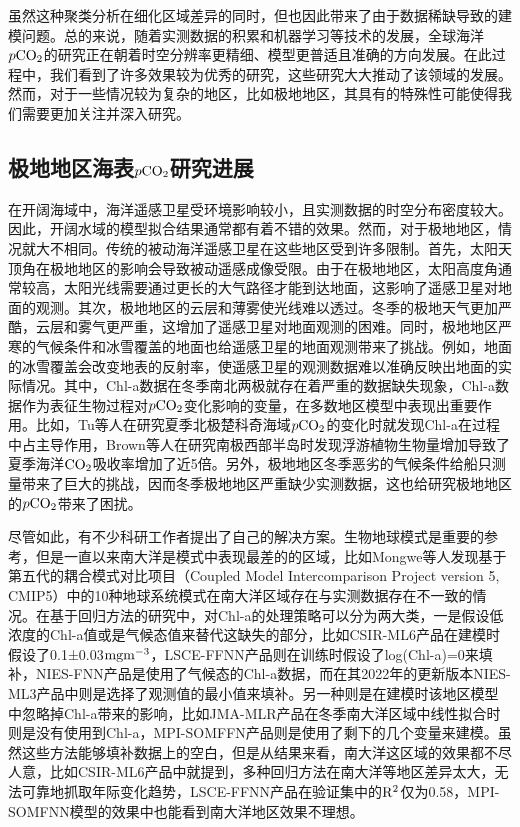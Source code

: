 虽然这种聚类分析在细化区域差异的同时，但也因此带来了由于数据稀缺导致的建模问题。总的来说，随着实测数据的积累和机器学习等技术的发展，全球海洋$p\rm CO_2$的研究正在朝着时空分辨率更精细、模型更普适且准确的方向发展。在此过程中，我们看到了许多效果较为优秀的研究，这些研究大大推动了该领域的发展。然而，对于一些情况较为复杂的地区，比如极地地区，其具有的特殊性可能使得我们需要更加关注并深入研究。

\subsection{极地地区海表\texorpdfstring{$p\rm CO_2$}{}研究进展}
在开阔海域中，海洋遥感卫星受环境影响较小，且实测数据的时空分布密度较大。因此，开阔水域的模型拟合结果通常都有着不错的效果。然而，对于极地地区，情况就大不相同。传统的被动海洋遥感卫星在这些地区受到许多限制。首先，太阳天顶角在极地地区的影响会导致被动遥感成像受限。由于在极地地区，太阳高度角通常较高，太阳光线需要通过更长的大气路径才能到达地面，这影响了遥感卫星对地面的观测。其次，极地地区的云层和薄雾使光线难以透过。冬季的极地天气更加严酷，云层和雾气更严重，这增加了遥感卫星对地面观测的困难。同时，极地地区严寒的气候条件和冰雪覆盖的地面也给遥感卫星的地面观测带来了挑战。例如，地面的冰雪覆盖会改变地表的反射率，使遥感卫星的观测数据难以准确反映出地面的实际情况。其中，Chl-a数据在冬季南北两极就存在着严重的数据缺失现象，Chl-a数据作为表征生物过程对$p\rm CO_2$变化影响的变量，在多数地区模型中表现出重要作用。比如，Tu等人\cite{tu2021increase}在研究夏季北极楚科奇海域$p\rm CO_2$的变化时就发现Chl-a在过程中占主导作用，Brown等人\cite{brown2019enhanced}在研究南极西部半岛时发现浮游植物生物量增加导致了夏季海洋$\rm CO_2$吸收率增加了近5倍。另外，极地地区冬季恶劣的气候条件给船只测量带来了巨大的挑战，因而冬季极地地区严重缺少实测数据，这也给研究极地地区的$p\rm CO_2$带来了困扰。

尽管如此，有不少科研工作者提出了自己的解决方案。生物地球模式\cite{mongwe2016seasonal,mongwe2018seasonal,kessler2016southern}是重要的参考，但是一直以来南大洋是模式中表现最差的的区域，比如Mongwe等人\cite{mongwe2018seasonal}发现基于第五代的耦合模式对比项目（Coupled Model Intercomparison Project version 5, CMIP5）中的10种地球系统模式在南大洋区域存在与实测数据存在不一致的情况。在基于回归方法的研究中，对Chl-a的处理策略可以分为两大类，一是假设低浓度的Chl-a值或是气候态值来替代这缺失的部分，比如CSIR-ML6产品\cite{CSIR_ML6}在建模时假设了0.1±0.03$\rm mg m^{-3}$，LSCE-FFNN产品\cite{LSCE_FFNN}则在训练时假设了log(Chl-a)=0来填补，NIES-FNN产品\cite{zeng2014global}是使用了气候态的Chl-a数据，而在其2022年的更新版本NIES-ML3产品\cite{zeng2022surface}中则是选择了观测值的最小值来填补。另一种则是在建模时该地区模型中忽略掉Chl-a带来的影响，比如JMA-MLR产品\cite{JMA_MLR}在冬季南大洋区域中线性拟合时则是没有使用到Chl-a，MPI-SOMFFN产品\cite{MPI_SOMFFN}则是使用了剩下的几个变量来建模。虽然这些方法能够填补数据上的空白，但是从结果来看，南大洋这区域的效果都不尽人意，比如CSIR-ML6产品\cite{CSIR_ML6}中就提到，多种回归方法在南大洋等地区差异太大，无法可靠地抓取年际变化趋势，LSCE-FFNN产品\cite{LSCE_FFNN}在验证集中的$\rm R^2$仅为0.58，MPI-SOMFNN模型\cite{MPI_SOMFFN}的效果中也能看到南大洋地区效果不理想。

